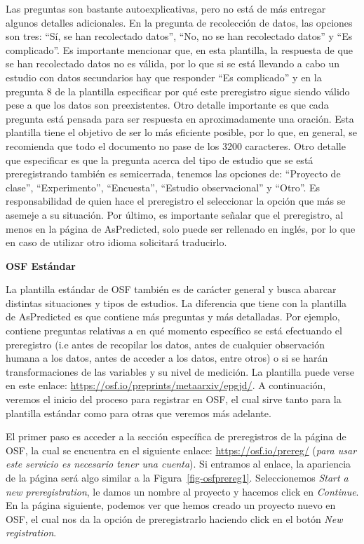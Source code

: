\documentclass[
  spanish,
  letterpaper,
  DIV=11,
  numbers=noendperiod]{scrreprt}
\begin{document}
Las preguntas son bastante autoexplicativas, pero no está de más
entregar algunos detalles adicionales. En la pregunta de recolección de
datos, las opciones son tres: ``Sí, se han recolectado datos'', ``No, no
se han recolectado datos'' y ``Es complicado''. Es importante mencionar
que, en esta plantilla, la respuesta de que se han recolectado datos no
es válida, por lo que si se está llevando a cabo un estudio con datos
secundarios hay que responder ``Es complicado'' y en la pregunta 8 de la
plantilla especificar por qué este preregistro sigue siendo válido pese
a que los datos son preexistentes. Otro detalle importante es que cada
pregunta está pensada para ser respuesta en aproximadamente una oración.
Esta plantilla tiene el objetivo de ser lo más eficiente posible, por lo
que, en general, se recomienda que todo el documento no pase de los 3200
caracteres. Otro detalle que especificar es que la pregunta acerca del
tipo de estudio que se está preregistrando también es semicerrada,
tenemos las opciones de: ``Proyecto de clase'', ``Experimento'',
``Encuesta'', ``Estudio observacional'' y ``Otro''. Es responsabilidad
de quien hace el preregistro el seleccionar la opción que más se asemeje
a su situación. Por último, es importante señalar que el preregistro, al
menos en la página de AsPredicted, solo puede ser rellenado en inglés,
por lo que en caso de utilizar otro idioma solicitará traducirlo.

\textbf{OSF Estándar}

La plantilla estándar de OSF también es de carácter general y busca
abarcar distintas situaciones y tipos de estudios. La diferencia que
tiene con la plantilla de AsPredicted es que contiene más preguntas y
más detalladas. Por ejemplo, contiene preguntas relativas a en qué
momento específico se está efectuando el preregistro (i.e antes de
recopilar los datos, antes de cualquier observación humana a los datos,
antes de acceder a los datos, entre otros) o si se harán
transformaciones de las variables y su nivel de medición. La plantilla
puede verse en este enlace:
\url{https://osf.io/preprints/metaarxiv/epgjd/}. A continuación, veremos
el inicio del proceso para registrar en OSF, el cual sirve tanto para la
plantilla estándar como para otras que veremos más adelante.

El primer paso es acceder a la sección específica de preregistros de la
página de OSF, la cual se encuentra en el siguiente enlace:
\url{https://osf.io/prereg/} (\emph{para usar este servicio es necesario
tener una cuenta}). Si entramos al enlace, la apariencia de la página
será algo similar a la Figura~\ref{fig-osfprereg1}. Seleccionemos
\emph{Start a new preregistration}, le damos un nombre al proyecto y
hacemos click en \emph{Continue}. En la página siguiente, podemos ver
que hemos creado un proyecto nuevo en OSF, el cual nos da la opción de
preregistrarlo haciendo click en el botón \emph{New registration}.
\end{document}
